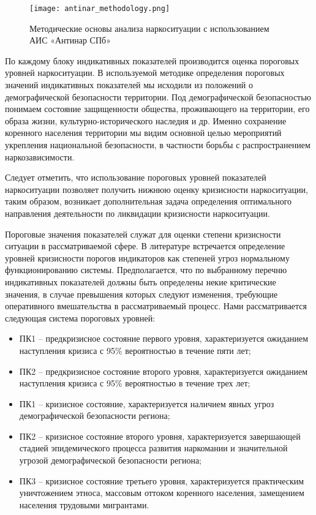 \begin{figure}
    \centering
    \texttt{[image: antinar\_methodology.png]}
    \caption{Методические основы анализа наркоситуации с использованием АИС
    «Антинар СПб»}
    \label{fig:antinar_methodology}
\end{figure}

По каждому блоку индикативных показателей производится оценка пороговых уровней
наркоситуации. В используемой методике определения пороговых значений
индикативных показателей мы исходили из положений о демографической безопасности
территории. Под демографической безопасностью понимаем состояние защищенности
общества, проживающего на территории, его образа жизни, культурно-исторического
наследия и др. Именно сохранение коренного населения территории мы видим
основной целью мероприятий укрепления национальной безопасности, в частности
борьбы с распространением наркозависимости.

Следует отметить, что использование пороговых уровней показателей наркоситуации
позволяет получить нижнюю оценку кризисности наркоситуации, таким образом,
возникает дополнительная задача определения оптимального направления
деятельности по ликвидации кризисности наркоситуации.

Пороговые значения показателей служат для оценки степени кризисности ситуации в
рассматриваемой сфере. В литературе встречается определение уровней
кризисности порогов индикаторов как степеней угроз нормальному функционированию
системы. Предполагается, что по выбранному перечню индикативных показателей
должны быть определены некие критические значения, в случае превышения которых
следуют изменения, требующие оперативного вмешательства в рассматриваемый
процесс. Нами рассматривается следующая система пороговых уровней:
\begin{itemize}
\item[] ПК1 – предкризисное состояние первого уровня, характеризуется ожиданием
наступления кризиса с 95\% вероятностью в течение пяти лет;
\item[] ПК2 – предкризисное состояние второго уровня, характеризуется ожиданием
наступления кризиса с 95\% вероятностью в течение трех лет;
\item[] ПК1 – кризисное состояние, характеризуется наличием явных угроз демографической
безопасности региона;
\item[] ПК2 – кризисное состояние второго уровня, характеризуется завершающей стадией
эпидемического процесса развития наркомании и значительной угрозой
демографической безопасности региона;
\item[] ПК3 – кризисное состояние третьего уровня, характеризуется практическим
уничтожением этноса, массовым оттоком коренного населения, замещением населения
трудовыми мигрантами.
\end{itemize}

